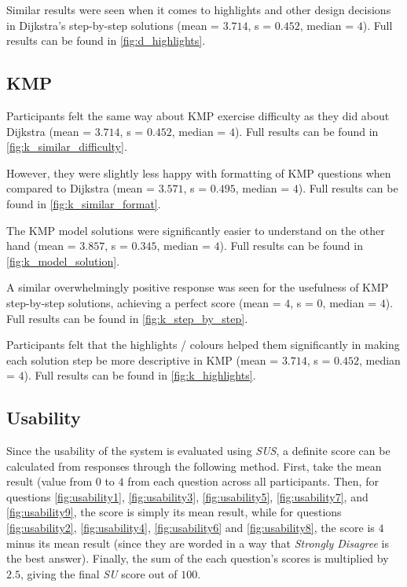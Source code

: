 \documentclass{l4proj}
\begin{document}
Similar results were seen when it comes to highlights and other design decisions in Dijkstra's step-by-step solutions (mean = $3.714$, s = $0.452$, median = $4$).  Full results can be found in \autoref{fig:d_highlights}.

\subsection{KMP}
\label{sec:k_results}

Participants felt the same way about KMP exercise difficulty as they did about Dijkstra  (mean = $3.714$, s = $0.452$, median = $4$). Full results can be found in \autoref{fig:k_similar_difficulty}.

However, they were slightly less happy with formatting of KMP questions when compared to Dijkstra  (mean = $3.571$, s = $0.495$, median = $4$). Full results can be found in \autoref{fig:k_similar_format}.

The KMP model solutions were significantly easier to understand on the other hand (mean = $3.857$, s = $0.345$, median = $4$). Full results can be found in \autoref{fig:k_model_solution}.

A similar overwhelmingly positive response was seen for the usefulness of KMP step-by-step solutions, achieving a perfect score  (mean = $4$, s = $0$, median = $4$). Full results can be found in \autoref{fig:k_step_by_step}.

Participants felt that the highlights / colours helped them significantly in making each solution step be more descriptive in KMP  (mean = $3.714$, s = $0.452$, median = $4$). Full results can be found in \autoref{fig:k_highlights}.

\subsection{Usability}
\cite{a}
Since the usability of the system is evaluated using \emph{SUS}, a definite score can be calculated from responses through the following method. First, take the mean result (value from $0$ to $4$ from each question across all participants. Then, for questions \autoref{fig:usability1}, \autoref{fig:usability3}, \autoref{fig:usability5}, \autoref{fig:usability7}, and \autoref{fig:usability9}, the score is simply its mean result, while for questions \autoref{fig:usability2}, \autoref{fig:usability4}, \autoref{fig:usability6} and \autoref{fig:usability8}, the score is $4$ minus its mean result (since they are worded in a way that \emph{Strongly Disagree} is the best answer). Finally, the sum of the each question's scores is multiplied by $2.5$, giving the final \emph{SU} score out of $100$.
\end{document}
